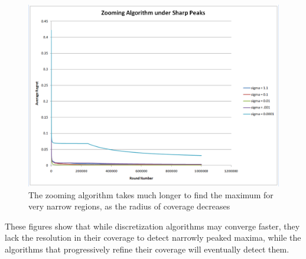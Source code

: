 \begin{figure}[!ht]
  \begin{center}
    \includegraphics[width=5 in]{figures/ZoomingBump.png}
     \caption{The zooming algorithm takes much longer to find the maximum for very narrow regions, as the radius of coverage decreases }
     \label{fig:zoombump2}
  \end{center}
\end{figure}



These figures show that while discretization algorithms may converge faster, they lack
the resolution in their coverage to detect narrowly peaked maxima, while the algorithms
that progressively refine their coverage will eventually detect them.